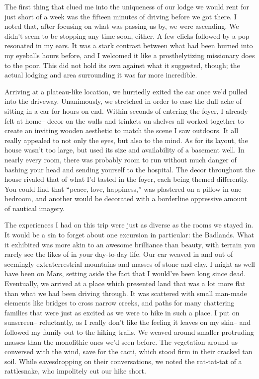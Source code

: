 \documentclass[12pt]{article}
\begin{document}
The first thing that clued me into the uniqueness of our lodge we would rent for just short of a week was the fifteen minutes of driving before we got there.  I noted that, after focusing on what was passing us by, we were ascending.  We didn't seem to be stopping any time soon, either.  A few clicks followed by a pop resonated in my ears.  It was a stark contrast between what had been burned into my eyeballs hours before, and I welcomed it like a prosthelytizing missionary does to the poor.  This did not hold its own against what it suggested, though;  the actual lodging and area surrounding it was far more incredible.

Arriving at a plateau-like location, we hurriedly exited the car once we'd pulled into the driveway.  Unanimously, we stretched in order to ease the dull ache of sitting in a car for hours on end.  Within seconds of entering the foyer, I already felt at home--  decor on the walls and trinkets on shelves all worked together to create an inviting wooden aesthetic to match the scene I saw outdoors.  It all really appealed to not only the eyes, but also to the mind.  As for its layout, the house wasn't too large, but used its size and availability of a basement well.  In nearly every room, there was probably room to run without much danger of bashing your head and sending yourself to the hospital.  The decor throughout the house rivaled that of what I'd tasted in the foyer, each being themed differently.  You could find that ``peace, love, happiness,'' was plastered on a pillow in one bedroom, and another would be decorated with a borderline oppressive amount of nautical imagery.

The experiences I had on this trip were just as diverse as the rooms we stayed in.  It would be a sin to forget about one excursion in particular:  the Badlands.  What it exhibited was more akin to an awesome brilliance than beauty, with terrain you rarely see the likes of in your day-to-day life.  Our car weaved in and out of seemingly extraterrestrial mountains and masses of stone and clay.  I might as well have been on Mars, setting aside the fact that I would've been long since dead.  Eventually, we arrived at a place which presented land that was a lot more flat than what we had been driving through.  It was scattered with small man-made elements like bridges to cross narrow creeks, and paths for many chattering families that were just as excited as we were to hike in such a place.  I put on sunscreen-- reluctantly, as I really don't like the feeling it leaves on my skin-- and followed my family out to the hiking trails.  We weaved around smaller protruding masses than the monolithic ones we'd seen before.  The vegetation around us conversed with the wind, save for the cacti, which stood firm in their cracked tan soil.  While eavesdropping on their conversations, we noted the rat-tat-tat of a rattlesnake, who impolitely cut our hike short. 
\end{document}
